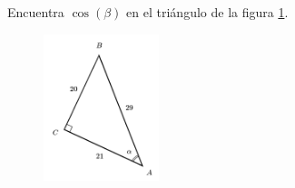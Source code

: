 Encuentra $\cos(\beta)$ en el triángulo de la figura \ref{fig:functrig05}.
\begin{figure}[H]
    \begin{center}
        \includegraphics[width=0.3\textwidth]{../images/functrig05.png}
    \end{center}
    \caption{}
    \label{fig:functrig05}
\end{figure}
